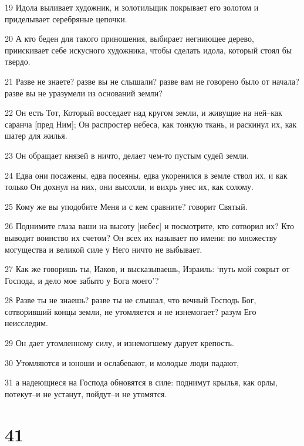\par 19 Идола выливает художник, и золотильщик покрывает его золотом и приделывает серебряные цепочки.
\par 20 А кто беден для такого приношения, выбирает негниющее дерево, приискивает себе искусного художника, чтобы сделать идола, который стоял бы твердо.
\par 21 Разве не знаете? разве вы не слышали? разве вам не говорено было от начала? разве вы не уразумели из оснований земли?
\par 22 Он есть Тот, Который восседает над кругом земли, и живущие на ней--как саранча [пред Ним]; Он распростер небеса, как тонкую ткань, и раскинул их, как шатер для жилья.
\par 23 Он обращает князей в ничто, делает чем-то пустым судей земли.
\par 24 Едва они посажены, едва посеяны, едва укоренился в земле ствол их, и как только Он дохнул на них, они высохли, и вихрь унес их, как солому.
\par 25 Кому же вы уподобите Меня и с кем сравните? говорит Святый.
\par 26 Поднимите глаза ваши на высоту [небес] и посмотрите, кто сотворил их? Кто выводит воинство их счетом? Он всех их называет по имени: по множеству могущества и великой силе у Него ничто не выбывает.
\par 27 Как же говоришь ты, Иаков, и высказываешь, Израиль: `путь мой сокрыт от Господа, и дело мое забыто у Бога моего'?
\par 28 Разве ты не знаешь? разве ты не слышал, что вечный Господь Бог, сотворивший концы земли, не утомляется и не изнемогает? разум Его неисследим.
\par 29 Он дает утомленному силу, и изнемогшему дарует крепость.
\par 30 Утомляются и юноши и ослабевают, и молодые люди падают,
\par 31 а надеющиеся на Господа обновятся в силе: поднимут крылья, как орлы, потекут--и не устанут, пойдут--и не утомятся.

\chapter{41}

